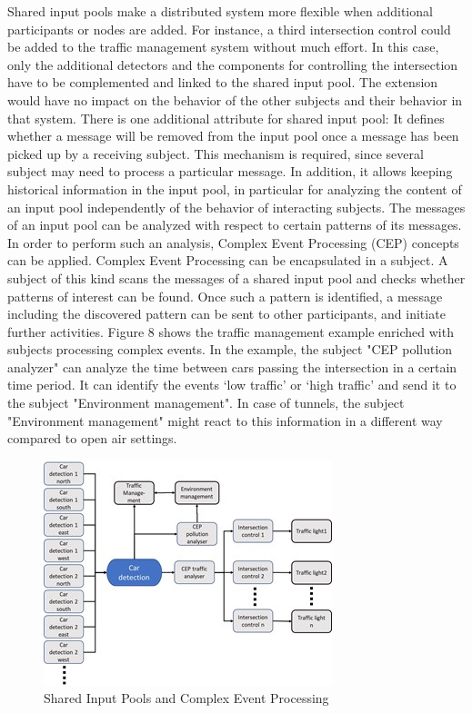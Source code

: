 Shared input pools make a distributed system more flexible when additional participants or nodes are added. For instance, a third intersection control could be added to the traffic management system without much effort. In this case, only the additional detectors and the components for controlling the intersection have to be complemented and linked to the shared input pool. The extension would have no impact on the behavior of the other subjects and their behavior in that system.
There is one additional attribute for shared input pool: It defines whether a message will be removed from the input pool once a message has been picked up by a receiving subject. This mechanism is required, since several subject may need to process a particular message. In addition, it allows keeping historical information in the input pool, in particular for analyzing the content of an input pool independently of the behavior of interacting subjects. 
The messages of an input pool can be analyzed with respect to certain patterns of its messages. In order to perform such an analysis, Complex Event Processing (CEP) concepts can be applied. Complex Event Processing can be encapsulated in a subject. A subject of this kind scans the messages of a shared input pool and checks whether patterns of interest can be found. Once such a pattern is identified, a message including the discovered pattern can be sent to other participants, and initiate further activities. Figure 8 shows the traffic management example enriched with subjects processing complex events.
In the example, the subject "CEP pollution analyzer" can analyze the time between cars passing the intersection in a certain time period. It can identify the events ‘low traffic’ or ‘high traffic’ and send it to the subject "Environment management". In case of tunnels, the subject "Environment management" might react to this information in a different way compared to open air settings. 


\begin{figure}
	\centering
	\includegraphics[width=0.7\linewidth]{Figures/Chapter5/figuresshared/SharedInputPoolEvent.jpg}
	\caption[Shared Input Pools and Complex Event Processing]{Shared Input Pools and Complex Event Processing}
	\label{fig:sharedInputPoolEvents}
\end{figure}






